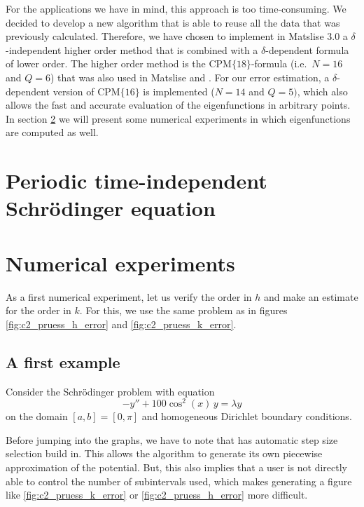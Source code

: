 For the applications we have in mind, this approach is too time-consuming. We decided to develop a new algorithm that is able to reuse all the data that was previously calculated. Therefore, we have chosen to implement in Matslise 3.0 a $\delta$-independent higher order method that is combined with a $\delta$-dependent formula of lower order. The higher order method is the $\text{CPM}\{18\}$-formula (i.e.\ $N=16$ and $Q=6$) that was also used in Matslise and . For our error estimation, a $\delta$-dependent version of $\text{CPM}\{16\}$ is implemented ($N=14$ and $Q=5)$, which also allows the fast and accurate evaluation of the eigenfunctions in arbitrary points. In section \ref{sec:c2_numerical_experiments} we will present some numerical experiments in which eigenfunctions are computed as well.

\section{Periodic \texorpdfstring{\oneD}{1D} time-independent Schrödinger equation}\label{sec:c2_periodic}

\begin{theorem}

\end{theorem}
\cite{binding_prufer_2012}


\section{Numerical experiments}\label{sec:c2_numerical_experiments}

As a first numerical experiment, let us verify the order in $h$ and make an estimate for the order in $k$. For this, we use the same problem as in figures \ref{fig:c2_pruess_h_error} and \ref{fig:c2_pruess_k_error}.

\subsection{A first example}

Consider the Schrödinger problem with equation
\begin{equation}\label{equ:c2_matslise_order_test_problem}
    -y'' + 100\cos^2(x)\,y = \lambda y
\end{equation}
on the domain $[a, b] = [0, \pi]$ and homogeneous Dirichlet boundary conditions.

Before jumping into the graphs, we have to note that  has automatic step size selection build in. This allows the algorithm to generate its own piecewise approximation of the potential. But, this also implies that a user is not directly able to control the number of subintervals used, which makes generating a figure like \ref{fig:c2_pruess_k_error} or \ref{fig:c2_pruess_h_error} more difficult.

